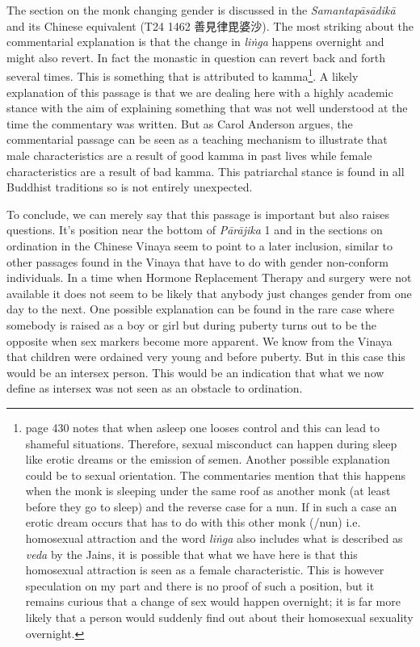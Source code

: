 The section on the monk changing gender is discussed in the {\em Samantapāsādikā} and its Chinese equivalent (T24 1462 善見律毘婆沙). The most striking about the commentarial explanation is that the change in {\em liṅga} happens overnight and might also revert. In fact the monastic in question can revert back and forth several times. This is something that is attributed to kamma\footnote{\cite{heirman} page 430 notes that when asleep one looses control and this can lead to shameful situations. Therefore, sexual misconduct can happen during sleep like erotic dreams or the emission of semen. Another possible explanation could be to sexual orientation. The commentaries mention that this happens when the monk is sleeping under the same roof as another monk (at least before they go to sleep) and the reverse case for a nun. If in such a case an erotic dream occurs that has to do with this other monk (/nun) i.e. homosexual attraction and the word {\em liṅga} also includes what is described as {\em veda} by the Jains, it is possible that what we have here is that this homosexual attraction is seen as a female characteristic. This is however speculation on my part and there is no proof of such a position, but it remains curious that a change of sex would happen overnight; it is far more likely that a person would suddenly find out about their homosexual sexuality overnight.}. A likely explanation of this passage is that we are dealing here with a highly academic stance with the aim of explaining something that was not well understood at the time the commentary was written. But as Carol Anderson argues, the commentarial passage can be seen as a teaching mechanism to illustrate that male characteristics are a result of good kamma in past lives while female characteristics are a result of bad kamma. This patriarchal stance is found in all Buddhist traditions so is not entirely unexpected. 

To conclude, we can merely say that this passage is important but also raises questions. It's position near the bottom of {\em Pārājika} 1 and in the sections on ordination in the Chinese Vinaya seem to point to a later inclusion, similar to other passages found in the Vinaya that have to do with gender non-conform individuals. In a time when Hormone Replacement Therapy and surgery were not available it does not seem to be likely that anybody just changes gender from one day to the next. One possible explanation can be found in the rare case where somebody is raised as a boy or girl but during puberty turns out to be the opposite when sex markers become more apparent. We know from the Vinaya that children were ordained very young and before puberty. But in this case this would be an intersex person. This would be an indication that what we now define as intersex was not seen as an obstacle to ordination.

